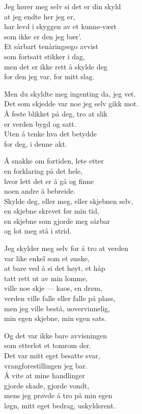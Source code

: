 \begin{lyrics}
Jeg hører meg selv si det er din skyld\\
at jeg endte her jeg er,\\
har levd i skyggen av et kunne-vært\\
som ikke er den jeg bær'.\\
Et sårbart tenåringsego avvist\\
som fortsatt stikker i dag,\\
men det er ikke rett å skylde deg\\
for den jeg var, for mitt slag.

Men du skyldte meg ingenting da, jeg vet.\\
Det som skjedde var noe jeg selv gikk mot.\\
Å feste blikket på deg, tro at slik\\
er verden bygd og satt.\\
Uten å tenke hva det betydde\\
for deg, i denne akt.

Å snakke om fortiden, lete etter\\
en forklaring på det hele,\\
hvor lett det er å gå og finne\\
noen andre å bebreide.\\
Skylde deg, eller meg, eller skjebnen selv,\\
en skjebne skrevet før min tid,\\
en skjebne som gjorde meg sårbar\\
og lot meg stå i strid.

Jeg skylder meg selv for å tro at verden\\
var like enkel som et ønske,\\
at bare ved å si det høyt, et håp\\
tatt rett ut av min lomme,\\
ville noe skje — kaos, en drøm,\\
verden ville falle eller falle på plass,\\
men jeg ville bestå, uovervinnelig,\\
min egen skjebne, min egen sats.

Og det var ikke bare avvisningen\\
som etterlot et tomrom der.\\
Det var mitt eget besatte svar,\\
vrangforestillingen jeg bar.\\
Å vite at mine handlinger\\
gjorde skade, gjorde vondt,\\
mens jeg prøvde å tro på min egen\\
løgn, mitt eget bedrag, uskyldsrent.


\end{lyrics}
